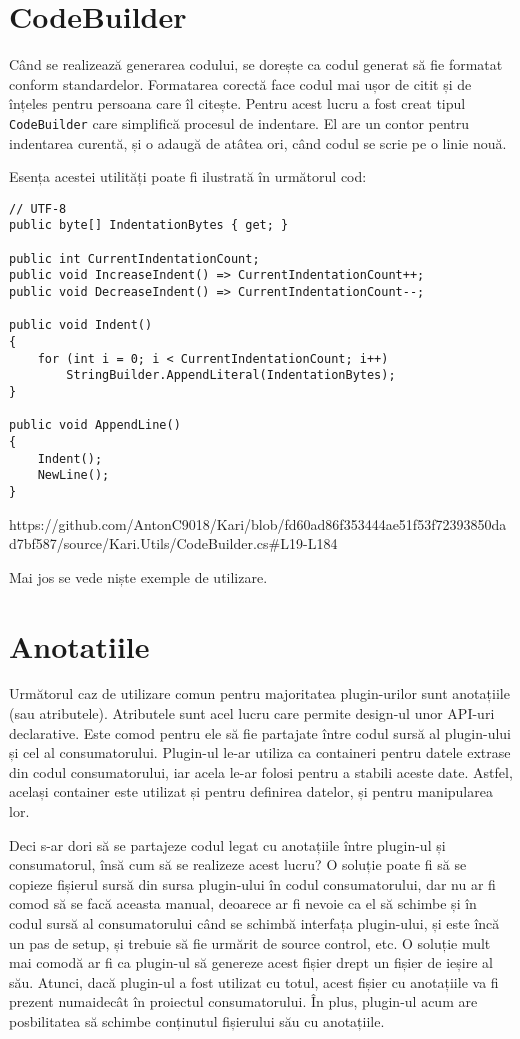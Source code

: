 \documentclass{report}
\begin{document}
\section{CodeBuilder}

Când se realizează generarea codului, se dorește ca codul generat să fie formatat conform standardelor.
Formatarea corectă face codul mai ușor de citit și de înțeles pentru persoana care îl citește.
Pentru acest lucru a fost creat tipul \texttt{CodeBuilder} care simplifică procesul de indentare.
El are un contor pentru indentarea curentă, și o adaugă de atâtea ori, când codul se scrie pe o linie nouă.

Esența acestei utilități poate fi ilustrată în următorul cod:

\begin{lstlisting}
// UTF-8
public byte[] IndentationBytes { get; }

public int CurrentIndentationCount;
public void IncreaseIndent() => CurrentIndentationCount++;
public void DecreaseIndent() => CurrentIndentationCount--;

public void Indent()
{
    for (int i = 0; i < CurrentIndentationCount; i++)
        StringBuilder.AppendLiteral(IndentationBytes);
}

public void AppendLine() 
{ 
    Indent();
    NewLine();
}
\end{lstlisting}

https://github.com/AntonC9018/Kari/blob/fd60ad86f353444ae51f53f72393850dad7bf587/source/Kari.Utils/CodeBuilder.cs#L19-L184

Mai jos se vede niște exemple de utilizare.

\section{Anotatiile}

Următorul caz de utilizare comun pentru majoritatea plugin-urilor sunt anotațiile (sau atributele).
Atributele sunt acel lucru care permite design-ul unor API-uri declarative.
Este comod pentru ele să fie partajate între codul sursă al plugin-ului și cel al consumatorului.
Plugin-ul le-ar utiliza ca containeri pentru datele extrase din codul consumatorului, iar acela le-ar folosi pentru a stabili aceste date.
Astfel, același container este utilizat și pentru definirea datelor, și pentru manipularea lor.

Deci s-ar dori să se partajeze codul legat cu anotațiile între plugin-ul și consumatorul, însă cum să se realizeze acest lucru?
O soluție poate fi să se copieze fișierul sursă din sursa plugin-ului în codul consumatorului, dar nu ar fi comod să se facă aceasta manual, deoarece ar fi nevoie ca el să schimbe și în codul sursă al consumatorului când se schimbă interfața plugin-ului, și este încă un pas de setup, și trebuie să fie urmărit de source control, etc.
O soluție mult mai comodă ar fi ca plugin-ul să genereze acest fișier drept un fișier de ieșire al său.
Atunci, dacă plugin-ul a fost utilizat cu totul, acest fișier cu anotațiile va fi prezent numaidecât în proiectul consumatorului.
În plus, plugin-ul acum are posbilitatea să schimbe conținutul fișierului său cu anotațiile.
\end{document}
